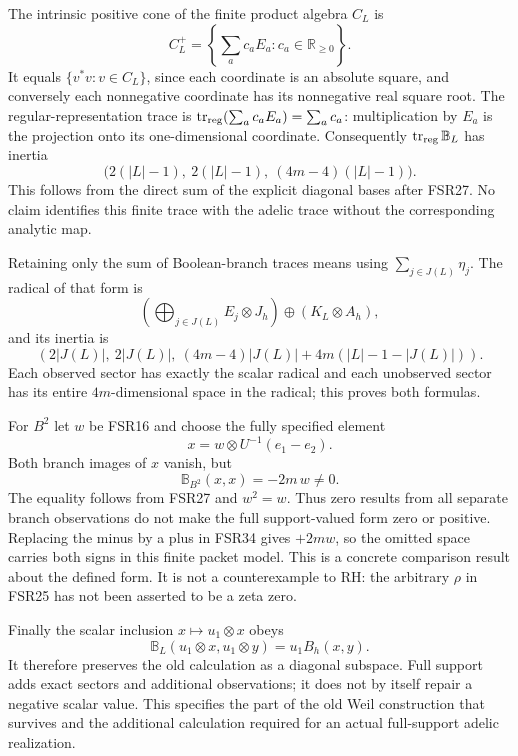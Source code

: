 \documentclass[
  10pt,
  a4paper,
]{article}
\begin{document}
The intrinsic positive cone of the finite product algebra \(C_L\) is \[
C_L^+=\left\{\sum_a c_a E_a:c_a\in\mathbb R_{\ge0}\right\}.
\tag{FSR30}
\] It equals \(\{v^*v:v\in C_L\}\), since each coordinate is an absolute
square, and conversely each nonnegative coordinate has its nonnegative
real square root. The regular-representation trace is
\(\operatorname{tr}_{\rm reg}(\sum_a c_a E_a)=\sum_a c_a\):
multiplication by \(E_a\) is the projection onto its one-dimensional
coordinate. Consequently \(\operatorname{tr}_{\rm reg}\mathbb B_L\) has
inertia \[
\bigl(2(|L|-1),\ 2(|L|-1),\ (4m-4)(|L|-1)\bigr).
\tag{FSR31}
\] This follows from the direct sum of the explicit diagonal bases after
FSR27. No claim identifies this finite trace with the adelic trace
without the corresponding analytic map.

Retaining only the sum of Boolean-branch traces means using
\(\sum_{j\in J(L)}\eta_j\). The radical of that form is \[
\left(\bigoplus_{j\in J(L)}E_j\otimes J_h\right)
\oplus\left(K_L\otimes A_h\right),
\tag{FSR32}
\] and its inertia is \[
\left(2|J(L)|,\ 2|J(L)|,\ (4m-4)|J(L)|+4m(|L|-1-|J(L)|)\right).
\tag{FSR33}
\] Each observed sector has exactly the scalar radical and each
unobserved sector has its entire \(4m\)-dimensional space in the
radical; this proves both formulas.

For \(B^2\) let \(w\) be FSR16 and choose the fully specified element \[
x=w\otimes U^{-1}(e_1-e_2).
\tag{FSR34}
\] Both branch images of \(x\) vanish, but \[
\mathbb B_{B^2}(x,x)=-2m\,w\neq0.
\tag{FSR35}
\] The equality follows from FSR27 and \(w^2=w\). Thus zero results from
all separate branch observations do not make the full support-valued
form zero or positive. Replacing the minus by a plus in FSR34 gives
\(+2m w\), so the omitted space carries both signs in this finite packet
model. This is a concrete comparison result about the defined form. It
is not a counterexample to RH: the arbitrary \(\rho\) in FSR25 has not
been asserted to be a zeta zero.

Finally the scalar inclusion \(x\mapsto u_1\otimes x\) obeys \[
\mathbb B_L(u_1\otimes x,u_1\otimes y)=u_1 B_h(x,y).
\tag{FSR36}
\] It therefore preserves the old calculation as a diagonal subspace.
Full support adds exact sectors and additional observations; it does not
by itself repair a negative scalar value. This specifies the part of the
old Weil construction that survives and the additional calculation
required for an actual full-support adelic realization.

\clearpage
\end{document}
